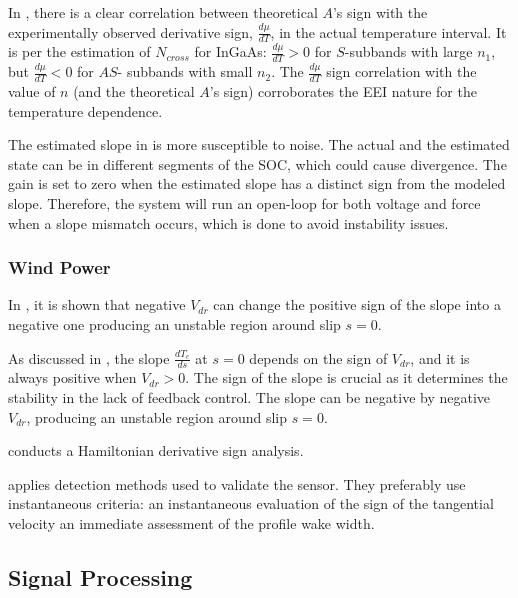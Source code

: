 \documentclass[11pt]{book}
\begin{document}
In \cite{gudina2019effect}, there is a clear correlation between
theoretical $A$'s sign with the experimentally observed derivative
sign, $\frac{d\mu}{dT}$, in the actual temperature interval. It is
per the estimation of $N_{cross}$ for InGaAs: $\frac{d\mu}{dT}>0$
for $S$-subbands with large $n_{1}$, but $\frac{d\mu}{dT}<0$ for
$AS$- subbands with small $n_{2}$. The $\frac{d\mu}{dT}$ sign correlation
with the value of $n$ (and the theoretical $A$'s sign) corroborates
the EEI nature for the temperature dependence.

The estimated slope in \cite{figueroa2020leveraging} is more susceptible
to noise. The actual and the estimated state can be in different segments
of the SOC, which could cause divergence. The gain is set to zero
when the estimated slope has a distinct sign from the modeled slope.
Therefore, the system will run an open-loop for both voltage and force
when a slope mismatch occurs, which is done to avoid instability issues.


\subsubsection{Wind Power}

In \cite{nagy2013control}, it is shown that negative $V_{dr}$ can
change the positive sign of the slope into a negative one producing
an unstable region around slip $s=0$.

As discussed in \cite{stumpf2013study}, the slope $\frac{dT_{e}}{ds}$
at $s=0$ depends on the sign of $V_{dr}$, and it is always positive
when $V_{dr}>0$. The sign of the slope is crucial as it determines
the stability in the lack of feedback control. The slope can be negative
by negative $V_{dr}$, producing an unstable region around slip $s=0$.

\cite{martynowicz2021nonlinear} conducts a Hamiltonian derivative
sign analysis.

\cite{soulier2021low} applies detection methods used to validate
the sensor. They preferably use instantaneous criteria: an instantaneous
evaluation of the sign of the tangential velocity an immediate assessment
of the profile wake width.


\subsection{Signal Processing}
\end{document}
